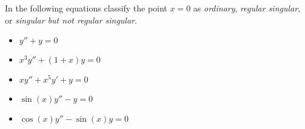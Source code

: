 \documentclass{ximera}
\begin{document}
\begin{exercise}%
    In the following equations classify the point $x=0$ as \emph{ordinary}, \emph{regular singular}, or \emph{singular but not regular singular}.
    \begin{itemize}
        \item $y''+y=0$
        \item $x^3y''+(1+x)y=0$
        \item $xy''+x^5y'+y=0$
        \item $\sin(x)y''-y=0$
        \item $\cos(x)y''-\sin(x)y=0$
    \end{itemize}
\end{exercise}
%
\end{document}
